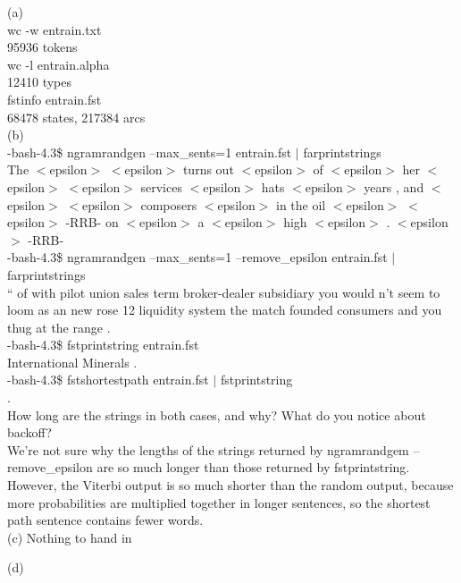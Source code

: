 \documentclass[11pt]{article} %
\begin{document}
(a)\\

wc -w entrain.txt\\
95936 tokens\\
wc -l entrain.alpha\\
12410 types\\
fstinfo entrain.fst\\
68478 states, 217384 arcs\\

(b)\\
-bash-4.3\$ ngramrandgen --max\_sents=1 entrain.fst $|$ farprintstrings\\
The $<$epsilon$>$ $<$epsilon$>$ turns out $<$epsilon$>$ of $<$epsilon$>$ her $<$epsilon$>$ $<$epsilon$>$ services $<$epsilon$>$ hats $<$epsilon$>$ years , and $<$epsilon$>$ $<$epsilon$>$ composers $<$epsilon$>$ in the oil $<$epsilon$>$ $<$epsilon$>$ -RRB- on $<$epsilon$>$ a $<$epsilon$>$ high $<$epsilon$>$ . $<$epsilon$>$ -RRB-\\


-bash-4.3\$ ngramrandgen --max\_sents=1 --remove\_epsilon entrain.fst $|$ farprintstrings\\
`` of with pilot union sales term broker-dealer subsidiary you would n't seem to loom as an new rose 12 liquidity system the match founded consumers and you thug at the range .\\

-bash-4.3\$ fstprintstring entrain.fst\\
International Minerals .\\

-bash-4.3\$ fstshortestpath entrain.fst $|$ fstprintstring\\
.\\

How long are the strings in both cases, and why? What do you notice about backoff? \\

We’re not sure why the lengths of the strings returned by ngramrandgem --remove\_epsilon are so much longer than those returned by fstprintstring. However, the Viterbi output is so much shorter than the random output, because more probabilities are multiplied together in longer sentences, so the shortest path sentence contains fewer words.\\

(c) Nothing to hand in\\

\newpage

(d) \\
\end{document}
